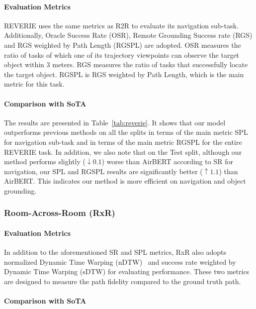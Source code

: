 \documentclass[10pt,twocolumn,letterpaper]{article}
\begin{document}
\paragraph{Evaluation Metrics}
REVERIE uses the same metrics as R2R to evaluate its navigation sub-task.
Additionally, Oracle Success Rate (OSR), Remote Grounding Success rate (RGS) and RGS weighted by Path Length (RGSPL) are adopted. 
OSR measures the ratio of tasks of which one of its trajectory viewpoints can observe the target object within 3 meters. RGS measures the ratio of tasks that successfully locate the target object.
RGSPL is RGS weighted by Path Length, which is the main metric for this task.

\vspace{-0pt}
\paragraph{Comparison with SoTA}
The results are presented in Table~\ref{tab:reverie}. 
It shows that our model outperforms previous methods  on all the splits in terms of the main metric SPL for navigation sub-task and in terms of the main metric RGSPL for the entire REVERIE task.
In addition, we also note that on the Test split, although our method performs slightly ($\downarrow0.1$) worse than AirBERT according to SR for navigation, our SPL and RGSPL results are significantly better ($\uparrow1.1$) than AirBERT. This indicates our method is more efficient on navigation and object grounding. 



\subsubsection{Room-Across-Room (RxR)}

\paragraph{Evaluation Metrics}
In addition to the aforementioned SR and SPL metrics, RxR also adopts normalized Dynamic Time Warping (nDTW)~\cite{ndtw} and success rate weighted by Dynamic Time Warping (sDTW) for evaluating performance. These two metrics are designed to measure the path fidelity compared to the ground truth path. 

\vspace{-0pt}
\paragraph{Comparison with SoTA}
\end{document}
